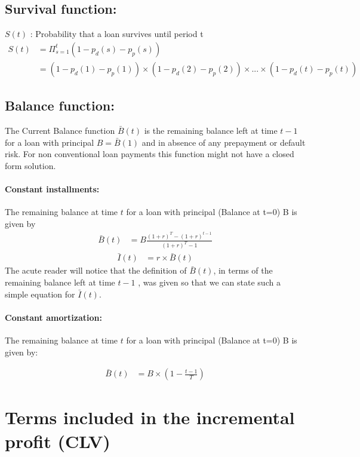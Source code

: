 \documentclass[12pt]{book}
\begin{document}
 \subsection{Survival function:}
$S(t)$ :   Probability that a loan survives until period t 
\begin{align}
S(t) & = \Pi_{s=1}^t (1-p_d(s) - p_p(s)) \\
 & = (1-p_d(1) - p_p(1))\times(1-p_d(2) - p_p(2))\times...\times(1-p_d(t) - p_p(t)) \nonumber
\end{align}

\subsection{Balance function: }
The Current Balance function $\bar{B}(t)$ is the remaining balance left at time $t-1$ for a loan with principal $B=\bar{B}(1)$ and in absence of any prepayment or default risk. For non conventional loan payments this function might not have a closed form solution. 


\paragraph{Constant installments:} The remaining balance at time $t$ for a loan with principal (Balance at t=0) B is given by 
\begin{align}
\bar{ B}(t)&=B\frac{(1+r)^T-(1+r)^{t-1}}{(1+r)^T-1}
\end{align}
\begin{align}
\bar{ I}(t)&=r\times \bar{ B}(t)
\end{align}
The acute reader will notice that the definition of $\bar{ B}(t)$, in terms of the remaining balance left at time $t-1$ , was given so that we can state such a simple equation for $\bar{ I}(t)$.


\paragraph{Constant amortization: } The remaining balance at time $t$ for a loan with principal (Balance at t=0) B is given by:

\begin{align}
\bar{ B}(t)&=B \times (1-\frac{t-1}{T})
\end{align}


\section{ Terms included in the incremental profit (CLV)}
\end{document}
